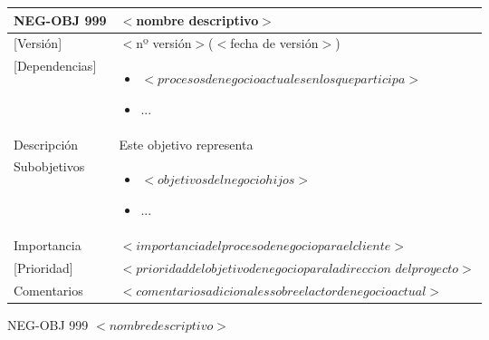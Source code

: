  \begin{Artefacto}[H]
    \centering
    \begin{tabular}{|p{3cm}|p{10cm}|}
        \hline
         \cellcolor{gray30}  NEG-OBJ 999	&  $<$nombre descriptivo$>$\\ 
        \hline
         \cellcolor{gray30}  [Versión]	&  $<$nº versión$>$($<$fecha de versión$>$)\\   
         \hline
         \cellcolor{gray30}  [Dependencias] &  	\begin{itemize} \item $<procesos de negocio actuales en los que participa>$
\item	... \end{itemize}\\  
        \hline
        \cellcolor{gray30} Descripción	& Este objetivo representa  \\
        \hline
                 \cellcolor{gray30}  Subobjetivos &  	\begin{itemize} \item $<objetivos del negocio hijos>$
\item	... \end{itemize}\\  
        \hline
         \cellcolor{gray30}Importancia	& $<importancia del proceso de negocio para el cliente>$  \\
        \hline
          \cellcolor{gray30}  [Prioridad] &  	$<prioridad del objetivo de negocio para la direccion$ $ del proyecto>$\\
         \hline
         \cellcolor{gray30}  Comentarios	&$<comentarios adicionales sobre el actor de negocio actual>$\\   
        \hline
  
    \end{tabular}
\caption{NEG-OBJ 999	$<nombre descriptivo>$ }
  \end{Artefacto}



